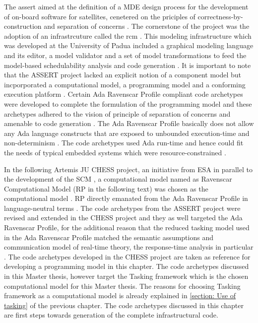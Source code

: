 The \ac{assert} aimed at the definition of a MDE design process for the development of on-board software for satellites, cenetered on the priciples of correctness-by-construction and separation of concerns \cite{PhdThesis}. The cornerstone of the project was the adoption of an infrastrcuture called the \ac{rcm} \cite{PhdThesis}. This modeling infrastructure which was developed at the University of Padua \cite{ScheduAnaly} included a graphical modeling language and its editor, a model validator and a set of model transformations to feed the model-based schedulability analysis and code generation \cite{ScheduAnaly}. It is important to note that the ASSERT project lacked an explicit notion of a component model but incporporated a computational model, a programming model and a conforming execution platform \cite{PhdThesis}. Certain Ada Ravenscar Profile compliant code archetypes were developed to complete the formulation of the programming model and these archetypes adhered to the vision of principle of separation of concerns and amenable to code generation \cite{CharEvoRAVCodeAr}. The Ada Ravenscar Profile basically does not allow any Ada language constructs that are exposed to unbounded execution-time and non-determinism \cite{RAVCodeAr}. The code archetypes used Ada run-time and hence could fit the needs of typical embedded systems which were resource-constrained \cite{RAVCodeAr}.   

In the following Artemis JU CHESS project, an initiative from ESA in parallel to the development of the SCM \cite{CompBasedProcess}\cite{PhdThesis}, a computational model named as Ravenscar Computational Model (RP in the following text) was chosen as the computational model \cite{ScheduAnaly}. RP directly emanated from the Ada Ravenscar Profile in language-neutral terms \cite{CharEvoRAVCodeAr}\cite{EvoRAVCodeAr}. The code archetypes from the ASSERT project were revised and extended in the CHESS project and they as well targeted the Ada Ravenscar Profile, for the additional reason that the reduced tasking model used in the Ada Ravenscar Profile matched the semantic assumptions and communication model of real-time theory, the response-time analysis in particular \cite{CharEvoRAVCodeAr}. The code archetypes developed in the CHESS project \cite{EvoRAVCodeAr} are taken as reference for developing a programming model in this chapter. The code archetypes discussed in this Master thesis, however target the Tasking framework which is the chosen computational model for this Master thesis. The reasons for choosing Tasking framework as a computational model is already explained in \cref{section: Use of tasking} of the previous chapter. The code archetypes discussed in this chapter are first steps towards generation of the complete infrastructural code. 

